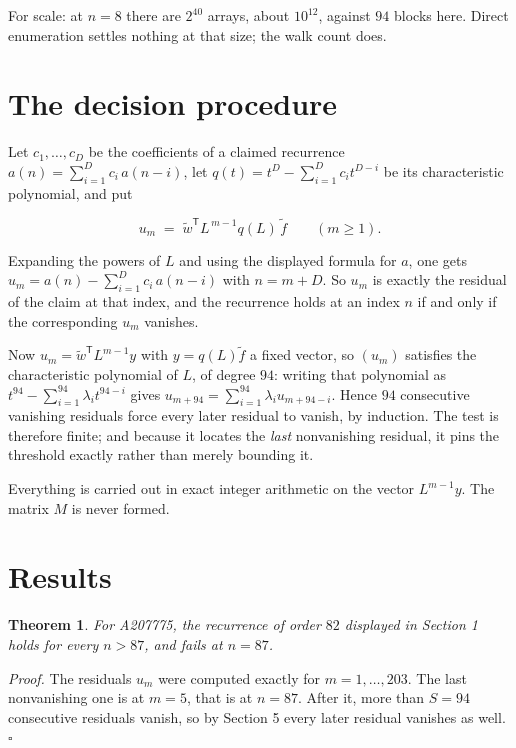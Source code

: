 \documentclass[11pt]{article}
\newtheorem{theorem}{Theorem}
\theoremstyle{definition}
\begin{document}
For scale: at $n = 8$ there are $2^{40}$ arrays, about $10^{12}$, against $94$ blocks here. Direct enumeration settles nothing at that size; the walk count does.

\section{The decision procedure}

Let $c_1,\dots,c_D$ be the coefficients of a claimed recurrence $a(n) = \sum_{i=1}^{D} c_i\,a(n-i)$, let $q(t) = t^{D} - \sum_{i=1}^{D} c_i t^{D-i}$ be its characteristic polynomial, and put

\[u_m \;=\; \tilde w^{\mathsf T} L^{\,m-1} q(L)\,\tilde f \qquad (m \ge 1).\]

Expanding the powers of $L$ and using the displayed formula for $a$, one gets $u_m = a(n) - \sum_{i=1}^{D} c_i\,a(n-i)$ with $n = m + D$. So $u_m$ is exactly the residual of the claim at that index, and the recurrence holds at an index $n$ if and only if the corresponding $u_m$ vanishes.

Now $u_m = \tilde w^{\mathsf T} L^{m-1} y$ with $y = q(L)\tilde f$ a fixed vector, so $(u_m)$ satisfies the characteristic polynomial of $L$, of degree $94$: writing that polynomial as $t^{94} - \sum_{i=1}^{94} \lambda_i t^{94-i}$ gives $u_{m+94} = \sum_{i=1}^{94} \lambda_i u_{m+94-i}$. Hence $94$ consecutive vanishing residuals force every later residual to vanish, by induction. The test is therefore finite; and because it locates the {\itshape last} nonvanishing residual, it pins the threshold exactly rather than merely bounding it.

Everything is carried out in exact integer arithmetic on the vector $L^{m-1}y$. The matrix $M$ is never formed.

\section{Results}

\begin{theorem} For A207775, the recurrence of order $82$ displayed in Section 1 holds for every $n > 87$, and fails at $n = 87$.\end{theorem}

{\itshape Proof.} The residuals $u_m$ were computed exactly for $m = 1,\dots,203$. The last nonvanishing one is at $m = 5$, that is at $n = 87$. After it, more than $S = 94$ consecutive residuals vanish, so by Section 5 every later residual vanishes as well. $\square$
\end{document}
